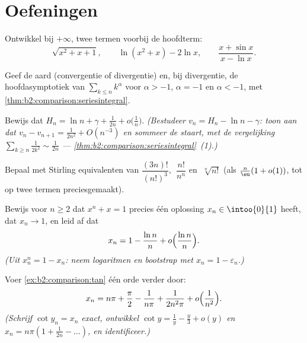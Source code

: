 \section{Oefeningen}

\begin{exercise}[$\star$]\label{exo:b2:comparison:1}
Ontwikkel bij $+\infty$, twee termen voorbij de hoofdterm:
\[
\sqrt{x^2 + x + 1} ,
\qquad
\ln(x^2 + x) - 2\ln x,
\qquad
\frac{x + \sin x}{x - \ln x} .
\]
\end{exercise}

\begin{exercise}[$\star$]\label{exo:b2:comparison:2}
Geef de aard (convergentie of divergentie) en, bij divergentie, de
hoofdasymptotiek van $\sum_{k \leq n} k^\alpha$ voor $\alpha > -1$,
$\alpha = -1$ en $\alpha < -1$, met
\cref{thm:b2:comparison:seriesintegral}.
\end{exercise}

\begin{exercise}[$\star\star$]\label{exo:b2:comparison:3}
Bewijs dat $H_n = \ln n + \gamma + \frac{1}{2n} +
o\bigl(\frac1n\bigr)$. \emph{(Bestudeer $v_n = H_n - \ln n -
\gamma$: toon aan dat $v_n - v_{n+1} = \frac{1}{2n^2} +
O(n^{-3})$ en sommeer de staart, met de vergelijking $\sum_{k \geq
n} \frac{1}{2k^2} \sim \frac{1}{2n}$ ---
\cref{thm:b2:comparison:seriesintegral}~(1).)}
\end{exercise}

\begin{exercise}[$\star\star$]\label{exo:b2:comparison:4}
Bepaal met Stirling equivalenten van $\dfrac{(3n)!}{(n!)^3}$,
$\;\dfrac{n!}{n^n}$ en $\;\sqrt[n]{n!}$ (als $\frac n\eu(1 +
o(1))$, tot op twee termen preciesgemaakt).
\end{exercise}

\begin{exercise}[$\star\star$]\label{exo:b2:comparison:5}
Bewijs voor $n \geq 2$ dat $x^n + x = 1$ precies één oplossing $x_n
\in \intoo{0}{1}$ heeft, dat $x_n \to 1$, en leid af dat
\[
x_n = 1 - \frac{\ln n}{n} + o\Bigl(\frac{\ln n}{n}\Bigr).
\]
\emph{(Uit $x_n^n = 1 - x_n$: neem logaritmen en bootstrap met $x_n
= 1 - \varepsilon_n$.)}
\end{exercise}

\begin{exercise}[$\star\star$]\label{exo:b2:comparison:6}
Voer \cref{ex:b2:comparison:tan} één orde verder door:
\[
x_n = n\pi + \frac\pi2 - \frac{1}{n\pi} + \frac{1}{2n^2\pi} +
o\Bigl(\frac{1}{n^2}\Bigr).
\]
\emph{(Schrijf $\cot y_n = x_n$ exact, ontwikkel $\cot y = \frac1y
- \frac y3 + o(y)$ en $x_n = n\pi(1 + \frac{1}{2n} - \dots)$, en
identificeer.)}
\end{exercise}


